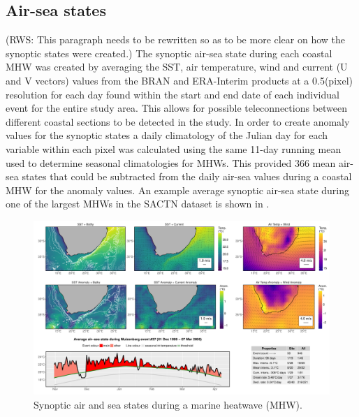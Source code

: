 \documentclass[a4paper,10pt,review]{elsarticle}
\begin{document}
\subsection{Air-sea states}
(RWS: This paragraph needs to be rewritten so as to be more clear on how the synoptic states were created.)
The synoptic air-sea state during each coastal MHW was created by averaging the SST, air temperature, wind and current (U and V vectors) values from the BRAN and ERA-Interim products at a 0.5\degree (pixel) resolution for each day found within the start and end date of each individual event for the entire study area. This allows for possible teleconnections between different coastal sections to be detected in the study. In order to create anomaly values for the synoptic states a daily climatology of the Julian day for each variable within each pixel was calculated using the same 11-day running mean used to determine seasonal climatologies for MHWs. This provided 366 mean air-sea states that could be subtracted from the daily air-sea values during a coastal MHW for the anomaly values. An example average synoptic air-sea state during one of the largest MHWs in the SACTN dataset is shown in .

\begin{figure}
\includegraphics[width=1.0\textwidth]{figure_2.pdf}
\caption{Synoptic air and sea states during a marine heatwave (MHW).}
\label{figure2}
\end{figure}
\end{document}
